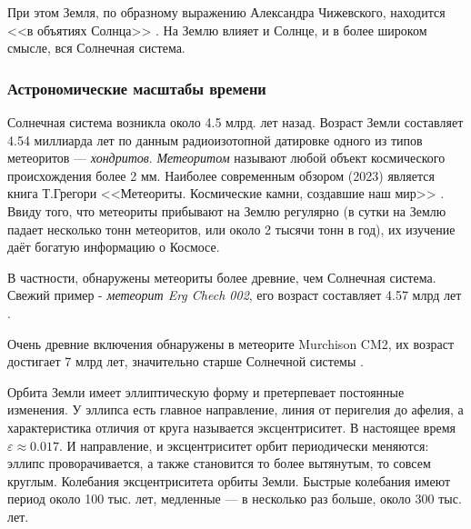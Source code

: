 \documentclass[a5paper,openany]{book}
\begin{document}
	При этом Земля, по образному выражению Александра Чижевского, находится <<в объятиях Солнца>> \cite{Chizevsky2004}.
	На Землю влияет и Солнце, и в более широком смысле, вся Солнечная система.
	
	\subsubsection{Астрономические масштабы времени} \label{AstroTimeScales}

Солнечная система возникла около 4.5 млрд. лет назад.
Возраст Земли составляет 4.54 миллиарда лет по данным  радиоизотопной датировке одного из типов метеоритов ---    \emph{хондритов}.  \emph{Метеоритом} называют любой объект  космического происхождения более 2 мм. Наиболее современным обзором (2023) является книга Т.Грегори <<Метеориты. Космические камни, создавшие наш мир>> \cite{Gregory2023}.	Ввиду того, что метеориты прибывают на Землю регулярно (в сутки на Землю падает несколько тонн метеоритов, или около 2 тысячи тонн в год), их изучение даёт богатую информацию о Космосе. 

В частности, обнаружены метеориты более древние, чем Солнечная система. Свежий пример - \emph{метеорит Erg Chech 002},    его возраст составляет 4.57 млрд лет \cite{Krestianinov2023}. 

Очень древние включения обнаружены в метеорите Murchison CM2,  их возраст достигает 7 млрд лет, значительно старше Солнечной системы \cite{Heck2020}.

Орбита Земли имеет эллиптическую форму и претерпевает постоянные изменения. У эллипса есть главное направление, линия от перигелия до афелия, а характеристика отличия от круга называется эксцентриситет. В настоящее время $\varepsilon \approx 0.017$. И направление, и эксцентриситет орбит периодически меняются: эллипс проворачивается, а также становится то более вытянутым, то совсем круглым. 
Колебания эксцентриситета орбиты Земли. Быстрые колебания имеют период около 100 тыс. лет, медленные --- в несколько раз больше, около 300 тыс. лет. 
\end{document}
